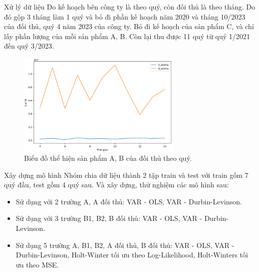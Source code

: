 \begin{frame}{Xử lý dữ liệu}
    Do kế hoạch bên công ty là theo quý, còn đối thủ là theo tháng. Do đó gộp 3 tháng làm 1 quý và bỏ đi phần kế hoạch năm 2020 và tháng 10/2023 của đối thủ, quý 4 năm 2023 của công ty. Bỏ đi kế hoạch của sản phẩm C, và chỉ lấy phần lượng của mỗi sản phẩm A, B. Còn lại thu được 11 quý từ quý 1/2021 đến quý 3/2023. 

    \begin{figure}[H]
    \centering
    \includegraphics[width = 0.7\textwidth]{figure/ABLuong.PNG}
    \caption{Biểu đồ thể hiện sản phẩm A, B của đối thủ theo quý.}
    \label{fig:ABLuong}
\end{figure}

\end{frame}


\begin{frame}{Xây dựng mô hình}
    Nhóm chia dữ liệu thành 2 tập train và test với train gốm 7 quý đầu, test gồm 4 quý sau. Và xây dựng, thử nghiệm các mô hình sau:
\begin{itemize}
    \item Sử dụng với 2 trường A, A đối thủ: VAR - OLS, VAR - Durbin-Levinson.
    \item Sử dụng với 3 trường B1, B2, B đối thủ: VAR - OLS, VAR - Durbin-Levinson.
    \item Sử dụng 5 trường A, B1, B2, A đối thủ, B đối thủ: VAR - OLS, VAR - Durbin-Levinson, Holt-Winter tối ưu theo Log-Likelihood, Holt-Winters tối ưu theo MSE.
\end{itemize}
\end{frame}

